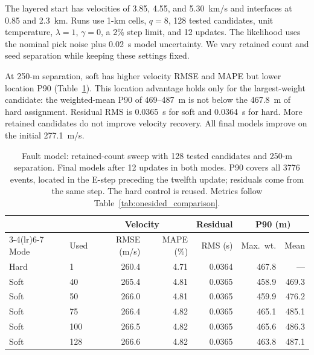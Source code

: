 The layered start has velocities of 3.85, 4.55, and 5.30~km/s and interfaces at 0.85 and 2.3~km. Runs use 1-km cells, $q=8$, 128 tested candidates, unit temperature, $\lambda=1$, $\gamma=0$, a 2\% step limit, and 12 updates. The likelihood uses the nominal pick noise plus 0.02~s model uncertainty. We vary retained count and seed separation while keeping these settings fixed.

At 250-m separation, soft has higher velocity RMSE and MAPE but lower location P90 (Table~\ref{tab:fault_retention}). This location advantage holds only for the largest-weight candidate: the weighted-mean P90 of 469--487~m is not below the 467.8~m of hard assignment. Residual RMS is 0.0365~s for soft and 0.0364~s for hard. More retained candidates do not improve velocity recovery. All final models improve on the initial 277.1~m/s.

\begin{table}[!htb]
\centering
\begin{singlespace}
\small
\setlength{\tabcolsep}{3.5pt}
\caption{Fault model: retained-count sweep with 128 tested candidates and 250-m separation. Final models after 12 updates in both modes. P90 covers all 3776 events, located in the E-step preceding the twelfth update; residuals come from the same step. The hard control is reused. Metrics follow Table~\ref{tab:onesided_comparison}.}
\label{tab:fault_retention}
\smallskip
\begin{tabular}{llrrrrr}
\toprule
& & \multicolumn{2}{c}{Velocity} & Residual & \multicolumn{2}{c}{P90 (m)} \\
\cmidrule(lr){3-4}\cmidrule(lr){6-7}
Mode & Used & RMSE (m/s) & MAPE (\%) & RMS (s) & Max.\ wt. & Mean \\
\midrule
Hard & 1 & 260.4 & 4.71 & 0.0364 & 467.8 & --- \\
Soft & 40 & 265.4 & 4.81 & 0.0365 & 458.9 & 469.3 \\
Soft & 50 & 266.0 & 4.81 & 0.0365 & 459.9 & 476.2 \\
Soft & 75 & 266.4 & 4.82 & 0.0365 & 465.1 & 485.1 \\
Soft & 100 & 266.5 & 4.82 & 0.0365 & 465.6 & 486.3 \\
Soft & 128 & 266.6 & 4.82 & 0.0365 & 463.8 & 487.1 \\
\bottomrule
\end{tabular}
\end{singlespace}
\end{table}

